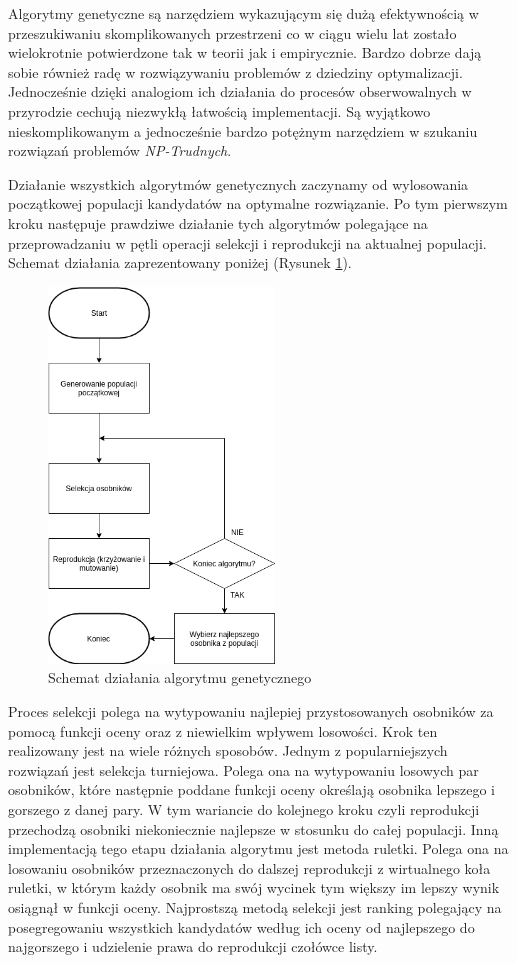 \documentclass[12pt, oneside, a4paper]{report}
\begin{document}
Algorytmy genetyczne są narzędziem wykazującym się dużą efektywnością w przeszukiwaniu skomplikowanych przestrzeni co w ciągu wielu lat zostało wielokrotnie potwierdzone tak w teorii jak i empirycznie. Bardzo dobrze dają sobie również radę w rozwiązywaniu problemów z dziedziny optymalizacji. Jednocześnie dzięki analogiom ich działania do procesów obserwowalnych w przyrodzie cechują niezwykłą łatwością implementacji. Są wyjątkowo nieskomplikowanym a jednocześnie bardzo potężnym narzędziem w szukaniu rozwiązań problemów \textit{NP-Trudnych}.

Działanie wszystkich algorytmów genetycznych zaczynamy od wylosowania początkowej populacji kandydatów na optymalne rozwiązanie. Po tym pierwszym kroku następuje prawdziwe działanie tych algorytmów polegające na przeprowadzaniu w pętli operacji selekcji i reprodukcji na aktualnej populacji. Schemat działania zaprezentowany poniżej (Rysunek \ref{fig: 3.1}).

\begin{figure}[h]
	\centering
	\includegraphics[width=6cm]{fig31.png}
	\caption{Schemat działania algorytmu genetycznego}
	\label{fig: 3.1}
\end{figure}

Proces selekcji polega na wytypowaniu najlepiej przystosowanych osobników za pomocą funkcji oceny oraz z niewielkim wpływem losowości. Krok ten realizowany jest na wiele różnych sposobów. Jednym z popularniejszych rozwiązań jest selekcja turniejowa. Polega ona na wytypowaniu losowych par osobników, które następnie poddane funkcji oceny określają osobnika lepszego i gorszego z danej pary. W tym wariancie do kolejnego kroku czyli reprodukcji przechodzą osobniki niekoniecznie najlepsze w stosunku do całej populacji. Inną implementacją tego etapu działania algorytmu jest metoda ruletki. Polega ona na losowaniu osobników przeznaczonych do dalszej reprodukcji z wirtualnego koła ruletki, w którym każdy osobnik ma swój wycinek tym większy im lepszy wynik osiągnął w funkcji oceny. Najprostszą metodą selekcji jest ranking polegający na posegregowaniu wszystkich kandydatów według ich oceny od najlepszego do najgorszego i udzielenie prawa do reprodukcji czołówce listy.
\end{document}
